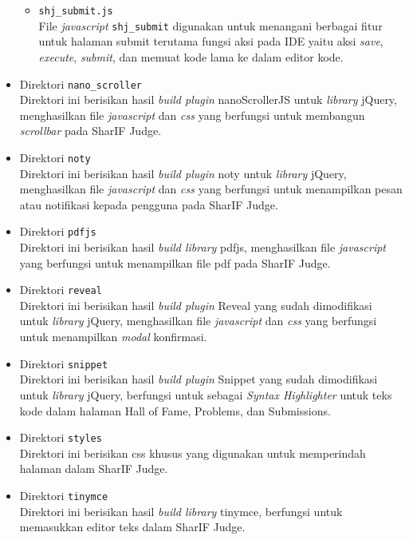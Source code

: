 \begin{itemize}
\begin{itemize}
		\item \verb|shj_submit.js| \\
		File \textit{javascript} \verb|shj_submit| digunakan untuk menangani berbagai fitur untuk halaman submit terutama fungsi aksi pada IDE yaitu aksi \textit{save}, \textit{execute}, \textit{submit}, dan memuat kode lama ke dalam editor kode.
	\end{itemize}
	\item Direktori \verb|nano_scroller| \\
	Direktori ini berisikan hasil \textit{build plugin} nanoScrollerJS untuk \textit{library} jQuery, menghasilkan file \textit{javascript} dan \textit{css} yang berfungsi untuk membangun \textit{scrollbar} pada SharIF Judge.
	\item Direktori \verb|noty| \\
	Direktori ini berisikan hasil \textit{build plugin} noty untuk \textit{library} jQuery, menghasilkan file \textit{javascript} dan \textit{css} yang berfungsi untuk menampilkan pesan atau notifikasi kepada pengguna pada SharIF Judge.
	\item Direktori \verb|pdfjs| \\
	Direktori ini berisikan hasil \textit{build library} pdfjs, menghasilkan file \textit{javascript} yang berfungsi untuk menampilkan file pdf pada SharIF Judge.
	\item Direktori \verb|reveal| \\
	Direktori ini berisikan hasil \textit{build plugin} Reveal yang sudah dimodifikasi untuk \textit{library} jQuery, menghasilkan file \textit{javascript} dan \textit{css} yang berfungsi untuk menampilkan \textit{modal} konfirmasi. 
	\item Direktori \verb|snippet| \\
	Direktori ini berisikan hasil \textit{build plugin} Snippet yang sudah dimodifikasi untuk \textit{library} jQuery, berfungsi untuk sebagai \textit{Syntax Highlighter} untuk teks kode dalam halaman Hall of Fame, Problems, dan Submissions.
	\item Direktori \verb|styles| \\
	Direktori ini berisikan css khusus yang digunakan untuk memperindah halaman dalam SharIF Judge.
	\item Direktori \verb|tinymce| \\
	Direktori ini berisikan hasil \textit{build library} tinymce, berfungsi untuk memasukkan editor teks dalam SharIF Judge.
\end{itemize}

